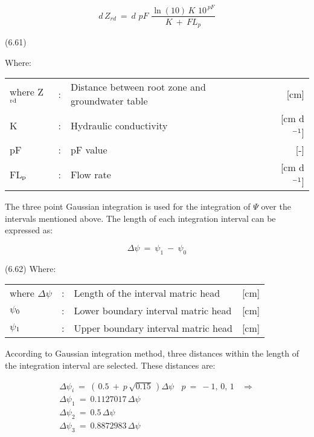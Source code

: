 \begin{equation}
d\, Z _{rd} ~=~ d\,\, pF\,\,{\frac{\ln (10)\, K\,\, 10^{\, pF} }{K~+~FL _{p} }}
\end{equation}

 
\strut\hfill (6.61)

Where:\\
\begin{tabularx}{\textwidth}{llXr}



where Z$_{{\rm rd}}$ &:& Distance between root zone and groundwater table  & [cm]\\
K &:& Hydraulic conductivity  & [cm d$^{{\rm -1}}$]\\
pF &:& pF value  & [-]\\
FL$_{{\rm p}}$ &:& Flow rate  & [cm d$^{{\rm -1}}$]
\end{tabularx}


 The three point Gaussian integration is used for the integration of $\Psi$ over the intervals
mentioned above. The length of each integration interval can be expressed as:

\begin{equation}
\Delta \psi ~=~ \psi _{1} ~-~ \psi _{0} 
\end{equation}

 
\strut\hfill (6.62)
Where:\\
\begin{tabularx}{\textwidth}{llXr}



where $\Delta$$\psi$ &:& Length of the interval matric head  & [cm]\\
$\psi$$_{{\rm 0}}$ &:& Lower boundary interval matric head  & [cm]\\
$\psi$$_{{\rm 1}}$ &:& Upper boundary interval matric head  & [cm]
\end{tabularx}



According to Gaussian integration method, three distances within the length of the
integration interval are selected. These distances are:

\begin{eqnarray*}
\Delta \psi _{i} ~=~ (\, 0.5 ~+~ p\, \sqrt{0.15} \, )\Delta \psi ~~~~ p~=~ -1,\, 0,\, 1~~~~ \Rightarrow   \nonumber  \\
\Delta \psi _{1} ~=~ 0.1127017\,\Delta \psi \nonumber  \\
\Delta \psi _{2} ~=~ 0.5\,\Delta \psi \nonumber  \\
\Delta \psi _{3} ~=~ 0.8872983\,\Delta \psi
\end{eqnarray*}

